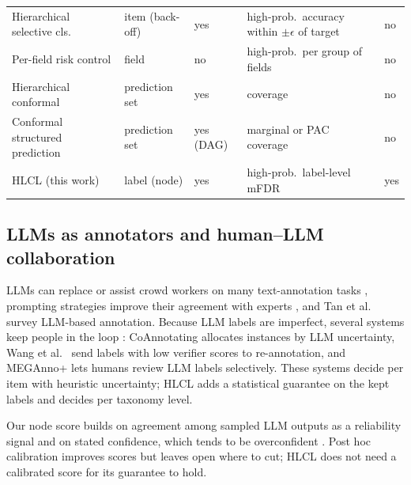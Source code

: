 \documentclass[preprint,12pt]{elsarticle}
\theoremstyle{definition}
\newcommand{\hlcl}{\textup{\textsc{HLCL}}}
\begin{document}
\begin{table}[!tbp]
\begin{tabularx}{\textwidth}{>{\raggedright\arraybackslash}X >{\raggedright\arraybackslash}p{2.1cm} >{\raggedright\arraybackslash}p{1.6cm} >{\raggedright\arraybackslash}p{2.9cm} >{\raggedright\arraybackslash}p{1.5cm}}
Hierarchical selective cls.\ \citep{goren2024hierarchical} & item (back-off) & yes & high-prob.\ accuracy within $\pm\epsilon$ of target & no \\ \addlinespace[2pt]
Per-field risk control \citep{gurram2026perfield} & field & no & high-prob.\ per group of fields & no \\ \addlinespace[2pt]
Hierarchical conformal \citep{denhengst2025hierarchical} & prediction set & yes & coverage & no \\ \addlinespace[2pt]
Conformal structured prediction \citep{zhang2025conformal} & prediction set & yes (DAG) & marginal or PAC coverage & no \\ \addlinespace[2pt]
\hlcl{} (this work) & label (node) & yes & high-prob.\ label-level mFDR & yes \\
\bottomrule
\end{tabularx}
\end{table}

\subsection{LLMs as annotators and human--LLM collaboration}
LLMs can replace or assist crowd workers on many text-annotation tasks
\citep{wang2021gpt3,gilardi2023chatgpt}, prompting strategies improve their
agreement with experts \citep{he2024annollm}, and Tan et al.~\cite{tan2024survey}
survey LLM-based annotation. Because LLM labels are imperfect, several systems
keep people in the loop \citep{wu2022hitl}: CoAnnotating
\citep{li2023coannotating} allocates instances by LLM uncertainty,
Wang et al.~\cite{wang2024humanllm} send labels with low verifier scores to
re-annotation, and MEGAnno+ \citep{kim2024meganno} lets humans review LLM labels
selectively. These systems decide per item with heuristic uncertainty; \hlcl{}
adds a statistical guarantee on the kept labels and decides per taxonomy level.

Our node score builds on agreement among sampled LLM outputs as a reliability
signal \citep{wang2023selfconsistency,kuhn2023semantic} and on stated
confidence, which tends to be overconfident \citep{xiong2024llms}. Post hoc
calibration \citep{guo2017calibration} improves scores but leaves open where to
cut; \hlcl{} does not need a calibrated score for its guarantee to hold.
\end{document}

